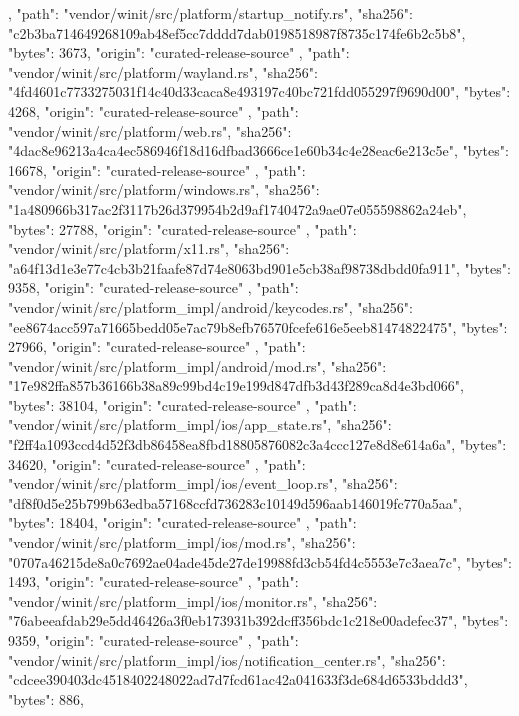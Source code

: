 {{    },
    {
      "path": "vendor/winit/src/platform/startup_notify.rs",
      "sha256": "c2b3ba714649268109ab48ef5cc7dddd7dab0198518987f8735c174fe6b2c5b8",
      "bytes": 3673,
      "origin": "curated-release-source"
    },
    {
      "path": "vendor/winit/src/platform/wayland.rs",
      "sha256": "4fd4601c7733275031f14c40d33caca8e493197c40bc721fdd055297f9690d00",
      "bytes": 4268,
      "origin": "curated-release-source"
    },
    {
      "path": "vendor/winit/src/platform/web.rs",
      "sha256": "4dac8e96213a4ca4ec586946f18d16dfbad3666ce1e60b34c4e28eac6e213c5e",
      "bytes": 16678,
      "origin": "curated-release-source"
    },
    {
      "path": "vendor/winit/src/platform/windows.rs",
      "sha256": "1a480966b317ac2f3117b26d379954b2d9af1740472a9ae07e055598862a24eb",
      "bytes": 27788,
      "origin": "curated-release-source"
    },
    {
      "path": "vendor/winit/src/platform/x11.rs",
      "sha256": "a64f13d1e3e77c4cb3b21faafe87d74e8063bd901e5cb38af98738dbdd0fa911",
      "bytes": 9358,
      "origin": "curated-release-source"
    },
    {
      "path": "vendor/winit/src/platform_impl/android/keycodes.rs",
      "sha256": "ee8674acc597a71665bedd05e7ac79b8efb76570fcefe616e5eeb81474822475",
      "bytes": 27966,
      "origin": "curated-release-source"
    },
    {
      "path": "vendor/winit/src/platform_impl/android/mod.rs",
      "sha256": "17e982ffa857b36166b38a89c99bd4c19e199d847dfb3d43f289ca8d4e3bd066",
      "bytes": 38104,
      "origin": "curated-release-source"
    },
    {
      "path": "vendor/winit/src/platform_impl/ios/app_state.rs",
      "sha256": "f2ff4a1093ccd4d52f3db86458ea8fbd18805876082c3a4ccc127e8d8e614a6a",
      "bytes": 34620,
      "origin": "curated-release-source"
    },
    {
      "path": "vendor/winit/src/platform_impl/ios/event_loop.rs",
      "sha256": "df8f0d5e25b799b63edba57168ccfd736283c10149d596aab146019fc770a5aa",
      "bytes": 18404,
      "origin": "curated-release-source"
    },
    {
      "path": "vendor/winit/src/platform_impl/ios/mod.rs",
      "sha256": "0707a46215de8a0c7692ae04ade45de27de19988fd3cb54fd4c5553e7c3aea7c",
      "bytes": 1493,
      "origin": "curated-release-source"
    },
    {
      "path": "vendor/winit/src/platform_impl/ios/monitor.rs",
      "sha256": "76abeeafdab29e5dd46426a3f0eb173931b392dcff356bdc1c218e00adefec37",
      "bytes": 9359,
      "origin": "curated-release-source"
    },
    {
      "path": "vendor/winit/src/platform_impl/ios/notification_center.rs",
      "sha256": "cdcee390403dc4518402248022ad7d7fcd61ac42a041633f3de684d6533bddd3",
      "bytes": 886,
}}
